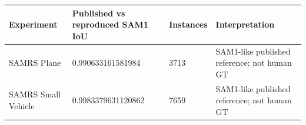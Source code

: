 \begin{tabular}{llll}
\toprule
Experiment & Published vs reproduced SAM1 IoU & Instances & Interpretation \\
\midrule
SAMRS Plane & 0.990633161581984 & 3713 & SAM1-like published reference; not human GT \\
SAMRS Small Vehicle & 0.9983379631120862 & 7659 & SAM1-like published reference; not human GT \\
\bottomrule
\end{tabular}
